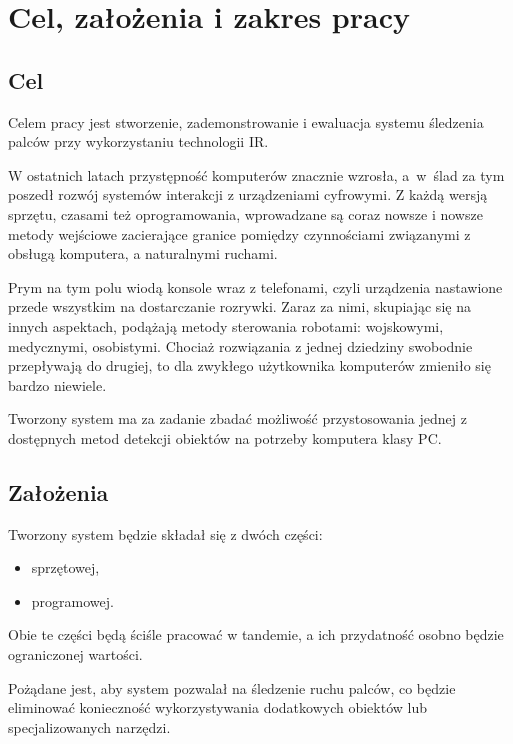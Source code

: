 \chapter{Cel, założenia i zakres pracy}\label{ch:purpose}

\section{Cel}

Celem pracy jest stworzenie, zademonstrowanie i ewaluacja systemu śledzenia palców przy wykorzystaniu technologii IR.

W ostatnich latach przystępność komputerów znacznie wzrosła, a~w~ślad za tym poszedł rozwój systemów interakcji z urządzeniami cyfrowymi. Z każdą wersją sprzętu, czasami też oprogramowania, wprowadzane są coraz nowsze i nowsze metody wejściowe zacierające granice pomiędzy czynnościami związanymi z obsługą komputera, a naturalnymi ruchami.

Prym na tym polu wiodą konsole wraz z telefonami, czyli urządzenia nastawione przede wszystkim na dostarczanie rozrywki. Zaraz za nimi, skupiając się na innych aspektach, podążają metody sterowania robotami: wojskowymi, medycznymi, osobistymi. Chociaż rozwiązania z jednej dziedziny swobodnie przepływają do drugiej, to dla zwykłego użytkownika komputerów zmieniło się bardzo niewiele.

Tworzony system ma za zadanie zbadać możliwość przystosowania jednej z dostępnych metod detekcji obiektów na potrzeby komputera klasy PC.\\

\section{Założenia}

Tworzony system będzie składał się z dwóch części:
\begin{itemize}
 \item sprzętowej,
 \item programowej.
\end{itemize}

Obie te części będą ściśle pracować w tandemie, a ich przydatność osobno będzie ograniczonej wartości.

Pożądane jest, aby system pozwalał na śledzenie ruchu palców, co będzie eliminować konieczność wykorzystywania dodatkowych obiektów lub specjalizowanych narzędzi.

